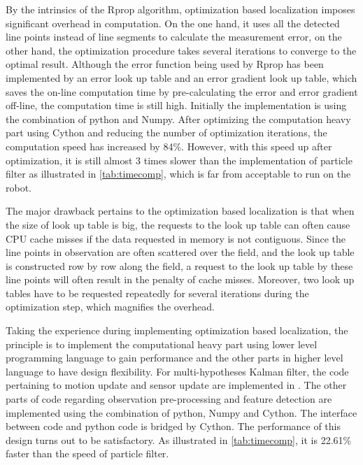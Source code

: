 By the intrinsics of the Rprop algorithm, optimization based localization imposes significant overhead in computation. On the one hand, it uses all the detected line points instead of line segments to calculate the measurement error, on the other hand, the optimization procedure takes several iterations to converge to the optimal result. Although the error function being used by Rprop has been implemented by an error look up table and an error gradient look up table, which saves the on-line computation time by pre-calculating the error and error gradient off-line, the computation time is still high. Initially the implementation is using the combination of python and Numpy. After optimizing the computation heavy part using Cython and reducing the number of optimization iterations, the computation speed has increased by 84\%. However, with this speed up after optimization, it is still almost 3 times slower than the implementation of particle filter as illustrated in \autoref{tab:timecomp}, which is far from acceptable to run on the robot.

The major drawback pertains to the optimization based localization is that when the size of look up table is big, the requests to the look up table can often cause CPU cache misses if the data requested in memory is not contiguous. Since the line points in observation are often scattered over the field, and the look up table is constructed row by row along the field, a request to the look up table by these line points will often result in the penalty of cache misses. Moreover, two look up tables have to be requested repeatedly for several iterations during the optimization step, which magnifies the overhead.

Taking the experience during implementing optimization based localization, the principle is to implement the computational heavy part using lower level programming language to gain performance and the other parts in higher level language to have design flexibility.
For multi-hypotheses Kalman filter, the code pertaining to motion update and sensor update are implemented in \cpp{}. The other parts of code regarding observation pre-processing and feature detection are implemented using the combination of python, Numpy and Cython. The interface between \cpp{} code and python code is bridged by Cython. The performance of this design turns out to be satisfactory. As illustrated in \autoref{tab:timecomp}, it is 22.61\% faster than the speed of particle filter.

